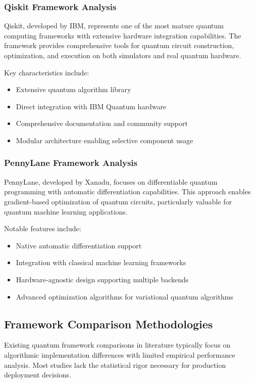 \documentclass[12pt,a4paper]{report}
\begin{document}
\subsubsection{Qiskit Framework Analysis}

Qiskit, developed by IBM, represents one of the most mature quantum computing frameworks with extensive hardware integration capabilities. The framework provides comprehensive tools for quantum circuit construction, optimization, and execution on both simulators and real quantum hardware.

Key characteristics include:
\begin{itemize}
\item Extensive quantum algorithm library
\item Direct integration with IBM Quantum hardware
\item Comprehensive documentation and community support
\item Modular architecture enabling selective component usage
\end{itemize}

\subsubsection{PennyLane Framework Analysis}

PennyLane, developed by Xanadu, focuses on differentiable quantum programming with automatic differentiation capabilities. This approach enables gradient-based optimization of quantum circuits, particularly valuable for quantum machine learning applications.

Notable features include:
\begin{itemize}
\item Native automatic differentiation support
\item Integration with classical machine learning frameworks
\item Hardware-agnostic design supporting multiple backends
\item Advanced optimization algorithms for variational quantum algorithms
\end{itemize}

\subsection{Framework Comparison Methodologies}

Existing quantum framework comparisons in literature typically focus on algorithmic implementation differences with limited empirical performance analysis. Most studies lack the statistical rigor necessary for production deployment decisions.
\end{document}
